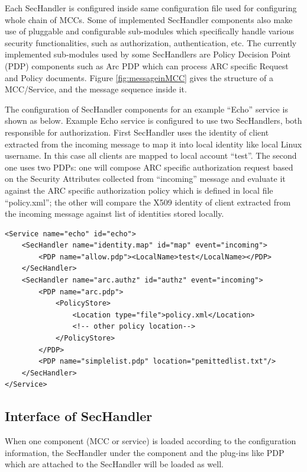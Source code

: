 \documentclass{article}                            %
\begin{document}
Each SecHandler is configured inside same configuration file used for configuring whole chain of MCCs. Some of implemented SecHandler components also make use of pluggable and configurable sub-modules which specifically handle various security functionalities, such as authorization, authentication, etc. The currently implemented sub-modules used by some SecHandlers are Policy Decision Point (PDP) components such as Arc PDP which can process ARC specific Request and Policy documents. Figure \ref{fig:messageinMCC} gives the structure of a MCC/Service, and the message sequence inside it. 

The configuration of SecHandler components for an example ``Echo'' service is shown as below. Example Echo service is configured to use two SecHandlers, both responsible for authorization. First SecHandler uses the identity of client extracted from the incoming message to map it into local identity like local Linux username. In this case all clients are mapped to local account “test”. The second one uses two PDPs: one will compose ARC specific authorization request based on the Security Attributes collected from “incoming” message and evaluate it against the ARC specific authorization policy which is defined in local file “policy.xml”; the other will compare the X509 identity of client extracted from the incoming message against list of identities stored locally.

\begin{verbatim}
<Service name="echo" id="echo">
    <SecHandler name="identity.map" id="map" event="incoming">
        <PDP name="allow.pdp"><LocalName>test</LocalName></PDP>
    </SecHandler>
    <SecHandler name="arc.authz" id="authz" event="incoming">
        <PDP name="arc.pdp">
            <PolicyStore>
                <Location type="file">policy.xml</Location>
                <!-- other policy location-->
            </PolicyStore>
        </PDP>
        <PDP name="simplelist.pdp" location="pemittedlist.txt"/>
    </SecHandler>
</Service>
\end{verbatim}


\subsection{Interface of SecHandler} %
\label{subsec:interface_sechandler}

When one component (MCC or service) is loaded according to the configuration information, the SecHandler under the component and the plug-ins like PDP which are attached to the SecHandler will be loaded as well. 
\end{document}
